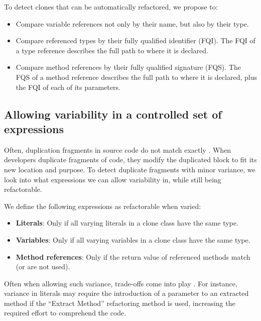\documentclass[sigconf,review, table]{acmart}
\begin{document}
To detect clones that can be automatically refactored, we propose to:
\begin{itemize}
  \item Compare variable references not only by their name, but also by their type.
  \item Compare referenced types by their fully qualified identifier (FQI). The FQI of a type reference describes the full path to where it is declared.
  \item Compare method references by their fully qualified signature (FQS). The FQS of a method reference describes the full path to where it is declared, plus the FQI of each of its parameters.
\end{itemize}


\subsection{Allowing variability in a controlled set of expressions} \label{sec:t2r}
Often, duplication fragments in source code do not match exactly \cite{kodhai2013method}. When developers duplicate fragments of code, they modify the duplicated block to fit its new location and purpose. To detect duplicate fragments with minor variance, we look into what expressions we can allow variability in, while still being refactorable.

We define the following expressions as refactorable when varied:
\begin{itemize}
  \item \textbf{Literals}: Only if all varying literals in a clone class have the same type.
  \item \textbf{Variables}: Only if all varying variables in a clone class have the same type.
  \item \textbf{Method references}: Only if the return value of referenced methods match (or are not used).
\end{itemize}
Often when allowing such variance, trade-offs come into play \cite{krishnan2013refactoring, krishnan2014unification}. For instance, variance in literals may require the introduction of a parameter to an extracted method if the ``Extract Method'' refactoring method is used, increasing the required effort to comprehend the code.
\end{document}

